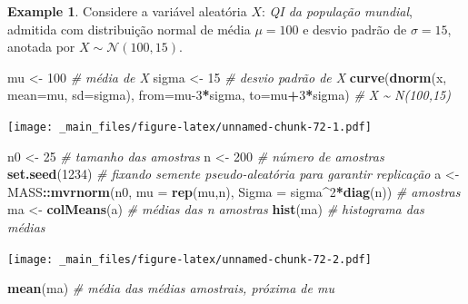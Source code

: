 \documentclass[
]{book}
\newenvironment{Shaded}{\begin{snugshade}}{\end{snugshade}}
\newcommand{\CommentTok}[1]{\textcolor[rgb]{0.56,0.35,0.01}{\textit{#1}}}
\newcommand{\DataTypeTok}[1]{\textcolor[rgb]{0.13,0.29,0.53}{#1}}
\newcommand{\DecValTok}[1]{\textcolor[rgb]{0.00,0.00,0.81}{#1}}
\newcommand{\KeywordTok}[1]{\textcolor[rgb]{0.13,0.29,0.53}{\textbf{#1}}}
\newcommand{\NormalTok}[1]{#1}
\newcommand{\OperatorTok}[1]{\textcolor[rgb]{0.81,0.36,0.00}{\textbf{#1}}}
\newcommand{\StringTok}[1]{\textcolor[rgb]{0.31,0.60,0.02}{#1}}
\theoremstyle{definition}
\theoremstyle{definition}
\newtheorem{example}{Example}[chapter]
\theoremstyle{definition}
\theoremstyle{remark}
\begin{document}
\begin{example}
\protect\hypertarget{exm:qi}{}{\label{exm:qi} }Considere a variável aleatória \(X\): \emph{QI da população mundial}, admitida com distribuição normal de média \(\mu=100\) e desvio padrão de \(\sigma=15\), anotada por \(X \sim \mathcal{N}(100,15)\).
\end{example}

\begin{Shaded}
\begin{Highlighting}[]
\NormalTok{mu \textless{}{-}}\StringTok{ }\DecValTok{100} \CommentTok{\# média de X}
\NormalTok{sigma \textless{}{-}}\StringTok{ }\DecValTok{15}  \CommentTok{\# desvio padrão de X}
\KeywordTok{curve}\NormalTok{(}\KeywordTok{dnorm}\NormalTok{(x, }\DataTypeTok{mean=}\NormalTok{mu, }\DataTypeTok{sd=}\NormalTok{sigma), }\DataTypeTok{from=}\NormalTok{mu}\DecValTok{{-}3}\OperatorTok{*}\NormalTok{sigma, }\DataTypeTok{to=}\NormalTok{mu}\OperatorTok{+}\DecValTok{3}\OperatorTok{*}\NormalTok{sigma) }\CommentTok{\# X \textasciitilde{} N(100,15)}
\end{Highlighting}
\end{Shaded}

\texttt{[image: \_main\_files/figure-latex/unnamed-chunk-72-1.pdf]}

\begin{Shaded}
\begin{Highlighting}[]
\NormalTok{n0 \textless{}{-}}\StringTok{ }\DecValTok{25} \CommentTok{\# tamanho das amostras}
\NormalTok{n \textless{}{-}}\StringTok{ }\DecValTok{200} \CommentTok{\# número de amostras}
\KeywordTok{set.seed}\NormalTok{(}\DecValTok{1234}\NormalTok{) }\CommentTok{\# fixando semente pseudo{-}aleatória para garantir replicação}
\NormalTok{a \textless{}{-}}\StringTok{ }\NormalTok{MASS}\OperatorTok{::}\KeywordTok{mvrnorm}\NormalTok{(n0, }\DataTypeTok{mu =} \KeywordTok{rep}\NormalTok{(mu,n), }\DataTypeTok{Sigma =}\NormalTok{ sigma}\OperatorTok{\^{}}\DecValTok{2}\OperatorTok{*}\KeywordTok{diag}\NormalTok{(n)) }\CommentTok{\# amostras}
\NormalTok{ma \textless{}{-}}\StringTok{ }\KeywordTok{colMeans}\NormalTok{(a) }\CommentTok{\# médias das n amostras}
\KeywordTok{hist}\NormalTok{(ma) }\CommentTok{\# histograma das médias}
\end{Highlighting}
\end{Shaded}

\texttt{[image: \_main\_files/figure-latex/unnamed-chunk-72-2.pdf]}

\begin{Shaded}
\begin{Highlighting}[]
\KeywordTok{mean}\NormalTok{(ma) }\CommentTok{\# média das médias amostrais, próxima de mu}
\end{Highlighting}
\end{Shaded}
\end{document}
